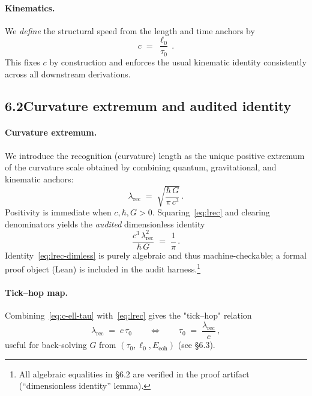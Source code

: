 \documentclass[12pt,a4paper]{article}
\theoremstyle{definition}
\theoremstyle{remark}
\begin{document}
\paragraph{Kinematics.}
We \emph{define} the structural speed from the length and time anchors by
\begin{equation}
\label{eq:c-ell-tau}
c \;=\; \frac{\ell_0}{\tau_0}\,.
\end{equation}
This fixes $c$ by construction and enforces the usual kinematic identity consistently across all downstream derivations.

\bigskip

\subsection*{6.2\quad Curvature extremum and audited identity}
\paragraph{Curvature extremum.}
We introduce the recognition (curvature) length as the unique positive extremum of the curvature scale obtained by combining quantum, gravitational, and kinematic anchors:
\begin{equation}
\label{eq:lrec}
\lambda_{\mathrm{rec}}
\;=\;
\sqrt{\frac{\hbar\,G}{\pi\,c^3}}\,.
\end{equation}
Positivity is immediate when $c,\hbar,G>0$. Squaring~\eqref{eq:lrec} and clearing denominators yields the \emph{audited} dimensionless identity
\begin{equation}
\label{eq:lrec-dimless}
\frac{c^3\,\lambda_{\mathrm{rec}}^2}{\hbar\,G} \;=\; \frac{1}{\pi}\,.
\end{equation}
Identity~\eqref{eq:lrec-dimless} is purely algebraic and thus machine-checkable; a formal proof object (Lean) is included in the audit harness.\footnote{All algebraic equalities in \S6.2 are verified in the proof artifact (``dimensionless identity'' lemma).}

\paragraph{Tick--hop map.}
Combining~\eqref{eq:c-ell-tau} with~\eqref{eq:lrec} gives the "tick–hop" relation
\begin{equation}
\label{eq:tick-hop}
\lambda_{\mathrm{rec}} \;=\; c\,\tau_0 \qquad\Longleftrightarrow\qquad \tau_0 \;=\; \frac{\lambda_{\mathrm{rec}}}{c}\,,
\end{equation}
useful for back-solving $G$ from $(\tau_0,\ell_0,E_{\mathrm{coh}})$ (see \S6.3).
\end{document}
